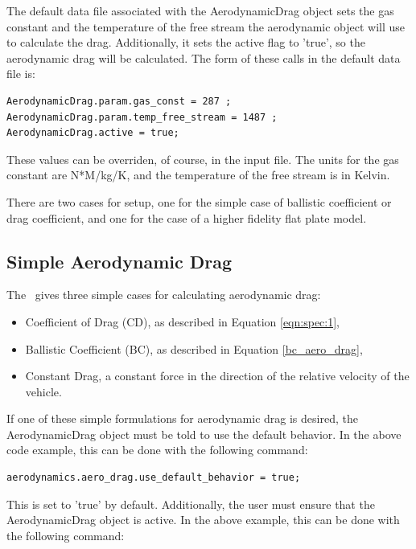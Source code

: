 The default data file associated with the AerodynamicDrag object
sets the gas constant and the temperature
of the free stream the aerodynamic object will use to calculate
the drag. Additionally, it sets the active flag to 'true', so the
aerodynamic drag will be calculated. The form of these calls
in the default data file is:

\begin{verbatim}
AerodynamicDrag.param.gas_const = 287 ;
AerodynamicDrag.param.temp_free_stream = 1487 ;
AerodynamicDrag.active = true;
\end{verbatim}

These values can be overriden, of course, in the input file. The
units for the gas constant are N*M/kg/K, and the temperature of
the free stream is in Kelvin.

There are two cases for setup, one for the simple case of ballistic coefficient
or drag coefficient, and one for the case of a higher fidelity flat plate
model.

\subsection{Simple Aerodynamic Drag}

The \aerodynamicsDesc\ gives three simple cases for calculating aerodynamic
drag:

\begin{itemize}
\item{Coefficient of Drag (CD)}, as described in Equation \eqref{eqn:spec:1},
\item{Ballistic Coefficient (BC)},
as described in Equation \eqref{bc_aero_drag},
\item{Constant Drag}, a constant force in the direction of the relative
velocity of the vehicle.
\end{itemize}

If one of these simple formulations for aerodynamic drag is desired,
the AerodynamicDrag object must be told to use the default behavior. In
the above code example, this can be done with the following command:

\begin{verbatim}
aerodynamics.aero_drag.use_default_behavior = true;
\end{verbatim}

This is set to 'true' by default. Additionally, the user must ensure that
the AerodynamicDrag object is active. In the above example, this can
be done with the following command:

